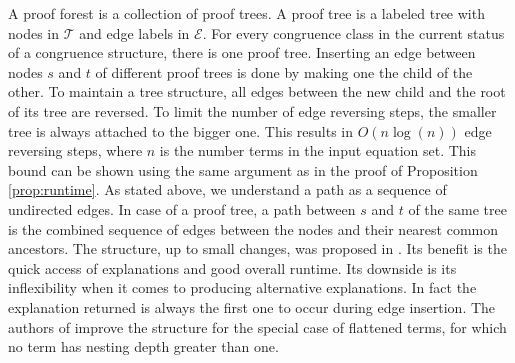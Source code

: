 A proof forest is a collection of proof trees.
A proof tree is a labeled tree with nodes in $\mathcal{T}$ and edge labels in $\mathcal{E}$.
For every congruence class in the current status of a congruence structure, there is one proof tree.
Inserting an edge between nodes $s$ and $t$ of different proof trees is done by making one the child of the other.
To maintain a tree structure, all edges between the new child and the root of its tree are reversed.
To limit the number of edge reversing steps, the smaller tree is always attached to the bigger one.
This results in $O(n \log(n))$ edge reversing steps, where $n$ is the number terms in the input equation set.
This bound can be shown using the same argument as in the proof of Proposition \ref{prop:runtime}.
As stated above, we understand a path as a sequence of undirected edges.
In case of a proof tree, a path between $s$ and $t$ of the same tree is the combined sequence of edges between the nodes and their nearest common ancestors.
The structure, up to small changes, was proposed in \cite{Nieuwenhuis2005,Nieuwenhuis2007}.
Its benefit is the quick access of explanations and good overall runtime.
Its downside is its inflexibility when it comes to producing alternative explanations.
In fact the explanation returned is always the first one to occur during edge insertion.
The authors of \cite{Nieuwenhuis2005,Nieuwenhuis2007} improve the structure for the special case of flattened terms, for which no term has nesting depth greater than one.





